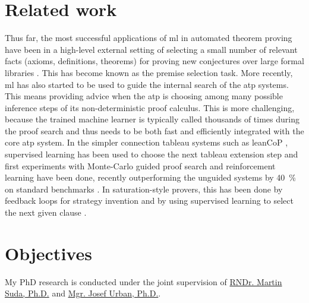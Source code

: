 \documentclass{article}
\begin{document}
\section{Related work}

Thus far, the most successful applications of \gls{ml} in automated theorem proving have been in a high-level external setting of selecting a small number of relevant facts (axioms, definitions, theorems) for proving new conjectures over large formal libraries \cite{DBLP:journals/jar/AlamaHKTU14,DBLP:journals/jar/BlanchetteGKKU16,DBLP:conf/cpp/GauthierK15}.
This has become known as the premise selection task.
More recently, \gls{ml} has also started to be used to guide the internal search of the \gls{atp} systems.
This means providing advice when the \gls{atp} is choosing among many possible inference steps of its non-deterministic proof calculus.
This is more challenging, because the trained machine learner is typically called thousands of times during the proof search and thus needs to be both fast and efficiently integrated with the core \gls{atp} system.
In the simpler connection tableau systems such as leanCoP \cite{10.1007/978-3-540-71070-7_23}, supervised learning has been used to choose the next tableau extension step \cite{DBLP:journals/jar/FarberKU21} and first experiments with Monte-Carlo guided proof search and reinforcement learning have been done, recently outperforming the unguided systems by \SI{40}{\percent} on standard benchmarks \cite{DBLP:conf/nips/KaliszykUMO18}.
In saturation-style provers, this has been done by feedback loops for strategy invention \cite{DBLP:journals/aicom/JakubuvU18,DBLP:conf/gcai/SchaferS15} and by using supervised learning \cite{DBLP:conf/cade/JakubuvCOP0U20,DBLP:conf/lpar/LoosISK17} to select the next given clause \cite{McCune2003}.


\section{Objectives}

My PhD research is conducted under the joint supervision of
\href{http://people.ciirc.cvut.cz/~sudamar2/}{RNDr. Martin Suda, Ph.D.} and
\href{https://people.ciirc.cvut.cz/~urbanjo3/}{Mgr. Josef Urban, Ph.D.}.
\end{document}
